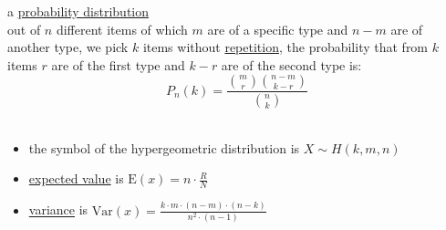 \documentclass[a4paper,12pt]{article}
\newcommand{\?}{\stackrel{?}{=}}
\begin{document}
\newenvironment{note}
  {\begin{bclogo}[logo=\bcinfo, couleurBarre=orange, couleur=lightgray]{ note}}
  {\end{bclogo}}
\newenvironment{attention}
  {\begin{bclogo}[logo=\bcattention, couleurBarre=red, noborder=true, 
                couleur=red!15]{Important!}}
  {\end{bclogo}}

\begin{definition}
a \href{20230120140123-probability_distribution.org}{probability distribution}\\[0pt]
out of \(n\) different items of which \(m\) are of a specific type and \(n-m\) are of another type, we pick \(k\) items without \href{20221204105120-combinatorics.org}{repetition}, the probability that from \(k\) items \(r\) are of the first type and \(k-r\) are of the second type is:\\[0pt]
\[
P_n(k) = \frac{\binom{m}{r} \binom{n-m}{k-r}}{\binom{n}{k}}
\]\\[0pt]
\begin{characteristic}
\begin{itemize}
\item the symbol of the hypergeometric distribution is \(X \sim H(k,m,n)\)\\[0pt]
\item \href{20230121184721-expected_value.org}{expected value} is \(\mathrm{E}(x)=n \cdot \frac{R}{N}\)\\[0pt]
\item \href{20230113164748-variance.org}{variance} is \(\mathrm{Var}(x)=\frac{k \cdot m \cdot (n-m) \cdot (n-k)}{n^2 \cdot (n-1)}\)\\[0pt]
\end{itemize}
\end{characteristic}
\end{definition}
\end{document}
